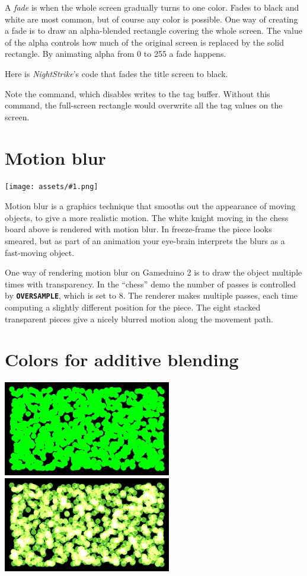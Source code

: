 \documentclass[10pt]{book}
\makeatletter
\newcommand{\gdtwo}{Gameduino 2 }
\newcommand{\png}[1]{
\begin{center}
\texttt{[image: assets/\#1.png]}
\end{center}
}
\newcommand{\mach}[1]{\texttt{\textbf{#1}}}
\newcommand{\cmdidx}[1]{
\index{#1@\mach{#1()}}
}
\newcommand{\dcmd}[1]{\cmdidx{#1}\nameref{#1}}
\newcommand{\term}[1]{\emph{#1}\index{#1}}
\makeatother
\begin{document}
A \term{fade} is when the whole screen gradually turns to one color.
Fades to black and white are most common, but of course any color is possible.
One way of creating a fade is to draw an alpha-blended rectangle covering the whole screen.
The value of the alpha controls how much of the original screen is replaced by the solid rectangle.
By animating alpha from 0 to 255 a fade happens.

Here is \textit{NightStrike}'s code that fades the title screen to black.


Note the \dcmd{TagMask} command, which disables writes
to the tag buffer.
Without this command,
the full-screen rectangle would overwrite all the tag values on the screen.

\newpage
\section{Motion blur}
\png{chess}

Motion blur is a graphics technique that smooths out the 
appearance of moving objects, to give a more realistic motion.
The white knight moving in the chess board above is rendered with
motion blur. In freeze-frame the piece looks smeared, but as part of
an animation your eye-brain interprets the blurs as
a fast-moving object.

One way of rendering motion blur on \gdtwo is to draw the object 
multiple times with transparency. In the ``chess'' demo the number of passes
is controlled by \mach{OVERSAMPLE}, which is set to 8.
The renderer makes multiple passes, each time computing a slightly different
position for the piece.  
The eight stacked transparent pieces give a nicely blurred motion along the movement path.


\newpage
\section{Colors for additive blending}

\begin{center}
\includegraphics[width=0.55\textwidth]{assets/0048.png}
\includegraphics[width=0.55\textwidth]{assets/0049.png}
\end{center}
\end{document}
